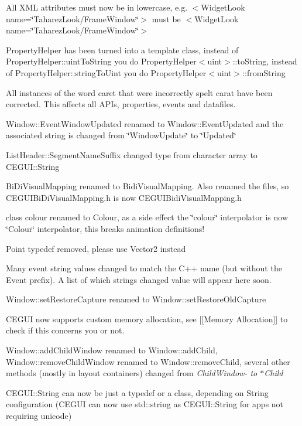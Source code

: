 \begin{DoxyItemize}
\item All X\+ML attributes must now be in lowercase, e.\+g. $<$\+Widget\+Look name=\char`\"{}\+Taharez\+Look/\+Frame\+Window\char`\"{}$>$ must be $<$\+Widget\+Look name=\char`\"{}\+Taharez\+Look/\+Frame\+Window\char`\"{}$>$
\item Property\+Helper has been turned into a template class, instead of Property\+Helper\+::uint\+To\+String you do Property\+Helper$<$uint$>$\+::to\+String, instead of Property\+Helper\+::string\+To\+Uint you do Property\+Helper$<$uint$>$\+::from\+String
\item All instances of the word caret that were incorrectly spelt \textquotesingle{}carat\textquotesingle{} have been corrected. This affects all A\+P\+Is, properties, events and datafiles.
\item Window\+::\+Event\+Window\+Updated renamed to Window\+::\+Event\+Updated and the associated string is changed from \char`\"{}\+Window\+Update\char`\"{} to \char`\"{}\+Updated\char`\"{}
\item List\+Header\+::\+Segment\+Name\+Suffix changed type from character array to C\+E\+G\+U\+I\+::\+String
\item Bi\+Di\+Visual\+Mapping renamed to Bidi\+Visual\+Mapping. Also renamed the files, so C\+E\+G\+U\+I\+Bi\+Di\+Visual\+Mapping.\+h is now C\+E\+G\+U\+I\+Bidi\+Visual\+Mapping.\+h
\item class colour renamed to Colour, as a side effect the \char`\"{}colour\char`\"{} interpolator is now \char`\"{}\+Colour\char`\"{} interpolator, this breaks animation definitions!
\item Point typedef removed, please use Vector2 instead
\item Many event string values changed to match the C++ name (but without the Event prefix). A list of which strings changed value will appear here soon.
\item Window\+::set\+Restore\+Capture renamed to Window\+::set\+Restore\+Old\+Capture
\item C\+E\+G\+UI now supports custom memory allocation, see \mbox{[}\mbox{[}Memory Allocation\mbox{]}\mbox{]} to check if this concerns you or not.
\item Window\+::add\+Child\+Window renamed to Window\+::add\+Child, Window\+::remove\+Child\+Window renamed to Window\+::remove\+Child, several other methods (mostly in layout containers) changed from {\itshape Child\+Window-\/ to $\ast$\+Child}
\item C\+E\+G\+U\+I\+::\+String can now be just a typedef or a class, depending on String configuration (C\+E\+G\+UI can now use std\+::string as C\+E\+G\+U\+I\+::\+String for apps not requiring unicode)

\end{DoxyItemize}
